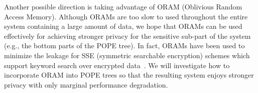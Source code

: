 


\iffalse
Another approach to reduce the leakage is leaving more ciphertexts in an
unsorted buffer (without affecting the performance significantly). 
In the original POPE construction, when an unsorted leaf buffer is full (i.e.,
containing more than $L$ ciphertexts), where $L$ is a threshold parameter, new
$L$ leaf nodes are created, and the ciphertexts are partitioned into $L$ newly
created buffers. This procedure greatly reduces the number of ciphertexts in
unsorted buffers and affects the security; in the worst case, some unsorted
buffer will have only a single ciphertext. With more careful split procedure,
we can maintain the reasonable number of ciphertexts even after the split.
\fi


Another possible direction is taking advantage of ORAM (Oblivious Random Access
Memory). Although ORAMs are too slow to used throughout the entire system
containing a large amount of data, we hope that ORAMs can be used effectively
for achieving stronger privacy for the sensitive sub-part of the system (e.g.,
the bottom parts of the POPE tree).  In fact, ORAMs have been used to minimize
the leakage for SSE (symmetric searchable encryption) schemes which support
keyword search over encrypted
data~\cite{NDSS:StePapShi14,C:GarMohPap16,RSA:IKLO16}. We will investigate how
to incorporate ORAM into POPE trees so that the resulting system enjoys
stronger privacy with only marginal performance degradation.  


